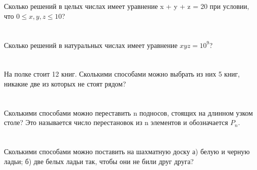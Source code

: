 \documentclass{article}%
\begin{document}
%
\section{}%
\label{sec:}%
Сколько решений в целых числах имеет уравнение x + y + z = 20 при условии,
что $0 \leq x, y, z \leq 10$?%
%
\iffalse%
Автор: Дмитрий Трущин%
Дата: 01{-}10{-}2013%
Название: None%
Подсказка: \textbackslash{}\textbackslash{}%
nan%
\fi

%
\section{}%
\label{sec:}%
Сколько решений в натуральных числах имеет уравнение $x y z=10^{9}$?%
%
\iffalse%
Автор: Дмитрий Трущин%
Дата: 01{-}10{-}2013%
Название: None%
Подсказка: \textbackslash{}\textbackslash{}%
nan%
\fi

%
\section{}%
\label{sec:}%
На полке стоит 12 книг. Сколькими способами можно выбрать из них 5 книг,
никакие две из которых не стоят рядом?%
%
\iffalse%
Автор: Дмитрий Трущин%
Дата: 01{-}10{-}2013%
Название: None%
Подсказка: \textbackslash{}\textbackslash{}%
nan%
\fi

%
\section{}%
\label{sec:}%
Сколькими способами можно переставить n подносов, стоящих на длинном узком столе? Это называется число перестановок из n элементов и обозначается $P_n$.%
%
\iffalse%
Автор: Ираклий Гагуа%
Дата: 07{-}01{-}2011%
Название: None%
Подсказка: \textbackslash{}\textbackslash{}%
nan%
\fi

%
\section{}%
\label{sec:}%
Сколькими способами можно поставить на шахматную доску а) белую и
черную ладьи; б) две белых ладьи так, чтобы они не били друг друга?%
%
\iffalse%
Автор: 25 школа%
Дата: 01{-}11{-}2012%
Название: None%
Подсказка: \textbackslash{}\textbackslash{}%
nan%
\fi

%
\end{document}
